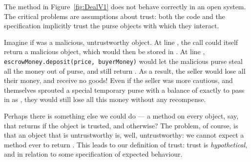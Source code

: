 The %
method in Figure~\ref{fig:DealV1} does not behave
correctly %
in an open system. %
The critical
problems are assumptions about trust: both the code and the
specification implicitly trust the purse objects with which they interact.
%
%

Imagine if  was a malicious, untrustworthy object. At
line , the  call could itself return a malicious object,
which would then be stored in . At line ,
%
\lstinline+escrowMoney.deposit(price, buyerMoney)+
%
would let the malicious  purse steal all the
money out of  purse, and still return . As
a result, the seller would lose all their money, and receive no goods!
Even if the seller was more cautious, and themselves sprouted a
special temporary purse with a balance of exactly  to pass
in as , they would still lose all this money without
any recompense.

Perhaps there is something else we could do --- a  method
on every object, say, that returns  if the object is
trusted, and  otherwise?
  The problem, of course, is that
an object that is untrustworthy is, well, untrustworthy: we cannot
expect a  method ever to return . 
This leads
to our definition of trust: trust is {\em hypothetical}, and in
relation to some specification of expected behaviour.




